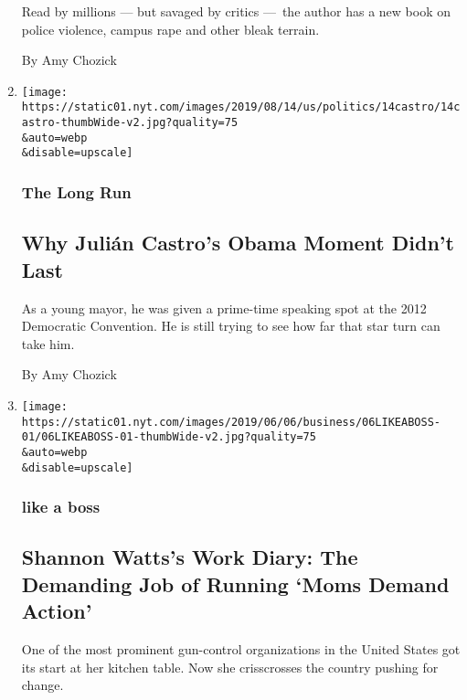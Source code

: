 \begin{enumerate}
  Read by millions --- but savaged by critics ---~the author has a new
  book on police violence, campus rape and other bleak terrain.

  By Amy Chozick
\item
  \href{/2019/08/18/us/politics/julian-castro-2020.html}{}

  \texttt{[image: https://static01.nyt.com/images/2019/08/14/us/politics/14castro/14castro-thumbWide-v2.jpg?quality=75\\\&auto=webp\\\&disable=upscale]}

  \hypertarget{the-long-run}{%
  \subsubsection{The Long Run}\label{the-long-run}}

  \hypertarget{why-juliuxe1n-castros-obama-moment-didnt-last}{%
  \subsection{Why Julián Castro's Obama Moment Didn't
  Last}\label{why-juliuxe1n-castros-obama-moment-didnt-last}}

  As a young mayor, he was given a prime-time speaking spot at the 2012
  Democratic Convention. He is still trying to see how far that star
  turn can take him.

  By Amy Chozick
\item
  \href{/2019/06/06/business/shannon-watts-moms-demand-action-gun-control-work-diary.html}{}

  \texttt{[image: https://static01.nyt.com/images/2019/06/06/business/06LIKEABOSS-01/06LIKEABOSS-01-thumbWide-v2.jpg?quality=75\\\&auto=webp\\\&disable=upscale]}

  \hypertarget{like-a-boss}{%
  \subsubsection{like a boss}\label{like-a-boss}}

  \hypertarget{shannon-wattss-work-diary-the-demanding-job-of-running-moms-demand-action}{%
  \subsection{Shannon Watts's Work Diary: The Demanding Job of Running
  `Moms Demand
  Action'}\label{shannon-wattss-work-diary-the-demanding-job-of-running-moms-demand-action}}

  One of the most prominent gun-control organizations in the United
  States got its start at her kitchen table. Now she crisscrosses the
  country pushing for change.


\end{enumerate}
